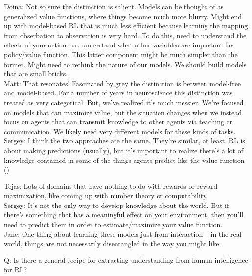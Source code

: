 Doina: Not so sure the distinction is salient. Models can be thought of as generalized value functions, where things become much more blurry. Might end up with model-based RL that is much less efficient because learning the mapping from obserbation to observation is very hard. To do this, need to understand the effects of your actions vs. understand what other variables are important for policy/value function. This latter component might be much simpler than the former. Might need to rethink the nature of our models. We should build models that are small bricks. \\

Matt: That resonates! Fascinated by grey the distinction is between model-free and model-based. For a number of years in neuroscience this distinction was treated as very categorical. But, we've realized it's much messier. We're focused on models that can maximize value, but the situation changes when we instead focus on agents that can transmit knowledge to other agents via teaching or communication. We likely need very different models for these kinds of tasks. \\

Sergey: I think the two approaches are the same. They're similar, at least. RL is about making predictions (usually), but it's important to realize there's a lot of knowledge contained in some of the things agents predict like the value function ()

Tejas: Lots of domains that have nothing to do with rewards or reward maximization, like coming up with number theory or computability. \\

Sergey: It's not the only way to develop knowledge about the world. But if there's something that has a meaningful effect on your environment, then you'll need to predict them in order to estimate/maximize your value function. \\

Jane: One thing about learning these models just from interaction -- in the real world, things are not necessarily disentangled in the way you might like.  \\

\spacerule

Q: Is there a general recipe for extracting understanding from human intelligence for RL? \\

